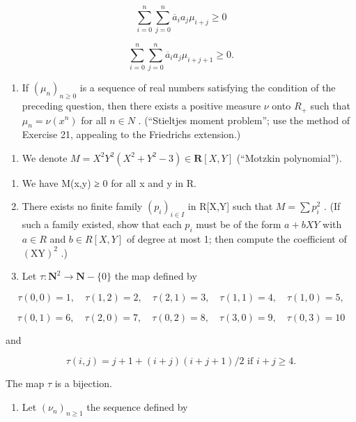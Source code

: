 \[
\sum_ {i = 0} ^ {n} \sum_ {j = 0} ^ {n} \overline {{a}} _ {i} a _ {j} \mu_ {i + j} \geqslant 0
\]

\[
\sum_ {i = 0} ^ {n} \sum_ {j = 0} ^ {n} \overline {{a}} _ {i} a _ {j} \mu_ {i + j + 1} \geqslant 0.
\]

\begin{enumerate}
\def\labelenumi{\alph{enumi})}
\setcounter{enumi}{1}
\tightlist
\item
  If \((\mu_{n})_{n\geqslant0}\) is a sequence of real numbers satisfying the condition of the preceding question, then there exists a positive measure \(\nu\) onto \(R_{+}\) such that \(\mu_{n}=\nu(x^{n})\) for all \(n\in N\) . (“Stieltjes moment problem”; use the method of Exercise 21, appealing to the Friedrichs extension.)
\end{enumerate}

\begin{enumerate}
\def\labelenumi{\arabic{enumi})}
\setcounter{enumi}{26}
\tightlist
\item
  We denote \(M = X^{2}Y^{2}(X^{2} + Y^{2} - 3) \in \mathbf{R}[X, Y]\) (“Motzkin polynomial”).
\end{enumerate}

\begin{enumerate}
\def\labelenumi{\alph{enumi})}
\item
  We have M(x,y) ≥ 0 for all x and y in R.
\item
  There exists no finite family \((p_{i})_{i\in I}\) in R{[}X,Y{]} such that \(M=\sum p_{i}^{2}\) . (If such a family existed, show that each \(p_{i}\) must be of the form \(a+bXY\) with \(a\in R\) and \(b\in R[X,Y]\) of degree at most 1; then compute the coefficient of \((\mathrm{XY})^{2}\) .)
\item
  Let \(\tau\colon\mathbf{N}^{2}\to\mathbf{N}-\{0\}\) the map defined by
\end{enumerate}

\[
\tau (0, 0) = 1, \quad \tau (1, 2) = 2, \quad \tau (2, 1) = 3, \quad \tau (1, 1) = 4, \quad \tau (1, 0) = 5,
\]

\[
\tau (0, 1) = 6, \quad \tau (2, 0) = 7, \quad \tau (0, 2) = 8, \quad \tau (3, 0) = 9, \quad \tau (0, 3) = 1 0
\]

and

\[
\tau (i, j) = j + 1 + (i + j) (i + j + 1) / 2 \text {   if   } i + j \geqslant 4.
\]

The map \(\tau\) is a bijection.

\begin{enumerate}
\def\labelenumi{\alph{enumi})}
\setcounter{enumi}{3}
\tightlist
\item
  Let \((\nu_{n})_{n\geqslant 1}\) the sequence defined by
\end{enumerate}

